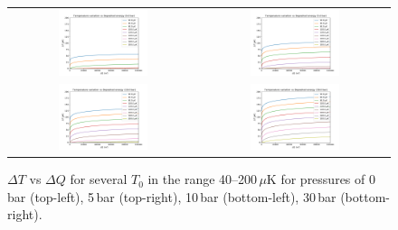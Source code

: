 \documentclass[a4paper,10pt]{article}
\begin{document}
\begin{figure}[!ht]
  \begin{center}
  \begin{tabular}{cc}
    \includegraphics[width=0.49\textwidth]{T_vs_DE-0bar} &
    \includegraphics[width=0.49\textwidth]{T_vs_DE-5bar} \\
    \includegraphics[width=0.49\textwidth]{T_vs_DE-10bar} &
    \includegraphics[width=0.49\textwidth]{T_vs_DE-30bar}
  \end{tabular}
  \end{center}
  \caption{$\Delta T$ vs $\Delta Q$ for several $T_0$ in the range 40--200\,$\mu$K for pressures of 0\,bar (top-left), 5\,bar (top-right), 10\,bar (bottom-left), 30\,bar (bottom-right).}
  \label{fig:TDE}
\end{figure}
\end{document}
